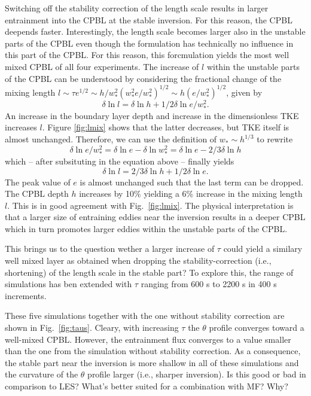 \documentclass[dvipdfmx,a4paper,10pt]{article}
\begin{document}
Switching off the stability correction of the length scale results in larger entrainment into the CPBL at the stable inversion. For this reason, the CPBL deepends faster. Interestingly, the length scale becomes larger also in the unstable parts of the CPBL even though the formulation has technically no influence in this part of the CPBL. For this reason, this forcmulation yields the most well mixed CPBL of all four experiments. The increase of $l$ within the unstable parts of the CPBL can be understood by considering the fractional change of the mixing length $l \sim \tau e^{1/2} \sim h/w_*^2 (w_*^2 e/w_*^2)^{1/2} \sim h (e/w_*^2)^{1/2}$, given by
\begin{equation}
 \delta \ln l = \delta \ln h + 1/2 \delta \ln e/w_*^2.
\end{equation}
An increase in the boundary layer depth and increase in the dimensionless TKE increases $l$. Figure \ref{fig:lmix} shows that the latter decreases, but TKE itself is almost unchanged. Therefore, we can use the definition of $w_*\sim h^{1/3}$ to rewrite
\begin{equation}
\delta \ln e/w_*^2 = \delta \ln e - \delta \ln w_*^2 = \delta \ln e - 2/3 \delta \ln h
\end{equation}
which -- after subsituting in the equation above -- finally yields
\begin{equation}
 \delta \ln l = 2/3 \delta \ln h + 1/2 \delta \ln e.
\end{equation}
The peak value of $e$ is almost unchanged such that the last term can be dropped. The CPBL depth $h$ increases by 10\% yielding a 6\% increase in the mixing length $l$. This is in good agreement with Fig.~\ref{fig:lmix}. The physical interpretation is that a larger size of entraining eddies near the inversion results in a deeper CPBL which in turn promotes larger eddies within the unstable parts of the CPBL.   

This brings us to the question wether a larger increase of $\tau$ could yield a similary well mixed layer as obtained when dropping the stability-correction (i.e., shortening) of the length scale in the stable part? To explore this, the range of simulations has ben extended with $\tau$ ranging from 600 s to 2200 s in 400 s increments.

These five simulations together with the one without stability correction are shown in Fig.~\ref{fig:taus}.  Cleary, with increasing $\tau$ the $\theta$ profile converges toward a well-mixed CPBL. However, the entrainment flux converges to a value smaller than the one from the simulation without stability correction. As a consequence, the stable part near the inversion is more shallow in all of these simulations and the curvature of the $\theta$ profile larger (i.e., sharper inversion). {\color{blue} Is this good or bad in comparison to LES? What's better suited for a combination with MF? Why?}
\end{document}
